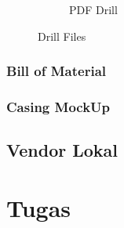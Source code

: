 \documentclass[12pt]{book}
\begin{document}
\begin{figure}[!ht]
\begin{subfigure}[t]{0.4\textwidth}
			\caption{PDF Drill}
		\end{subfigure}
		\caption{Drill Files}
	\end{figure}

	\subsection{Bill of Material}

	\subsection{Casing MockUp}

	\section{Vendor Lokal}


	\newpage
	\chapter{Tugas}
\end{document}
